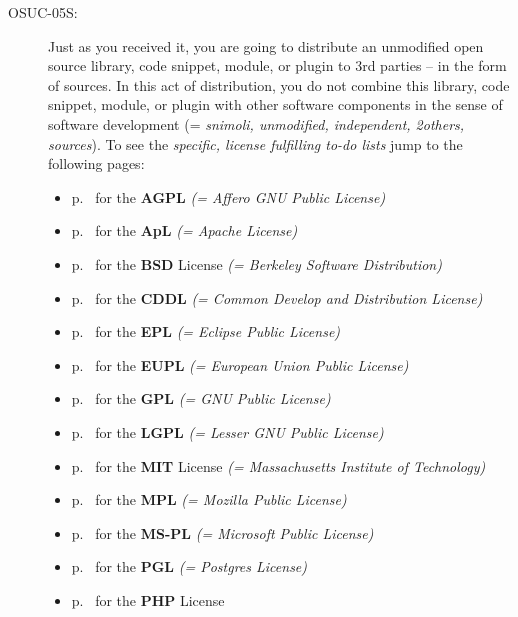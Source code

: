 \begin{description}
\item[OSUC-05S:]\label{OSUC-05S-DEF} Just as you received it, you are going to
distribute an unmodified open source library, code snippet, module, or plugin to
3rd parties  -- in the form of sources. In this act of distribution, you do not
combine this library, code snippet, module, or plugin with other software
components in the sense of software development (= \textit{snimoli, unmodified,
independent, 2others, sources}). To see the \textit{specific, license fulfilling
to-do lists} jump to the following pages:
  \begin{itemize}
    \item p.\ \pageref{OSUC-05S-AGPL} for the \textbf{AGPL}
      \textit{(= Affero GNU Public License)} 
    \item p.\ \pageref{OSUC-05S-Apache20} for the \textbf{ApL}
      \textit{(= Apache License)}
    \item p.\ \pageref{OSUC-05S-BSD} for the \textbf{BSD} License
      \textit{(= Berkeley Software Distribution)}
    \item p.\ \pageref{OSUC-05S-CDDL} for the \textbf{CDDL}
      \textit{(= Common Develop and Distribution License)}  
    \item p.\ \pageref{OSUC-05S-EPL} for the \textbf{EPL}
      \textit{(= Eclipse Public License)}     
    \item p.\ \pageref{OSUC-05S-EUPL} for the \textbf{EUPL}
      \textit{(= European Union Public License)} 
    \item p.\ \pageref{OSUC-05S-GPL} for the \textbf{GPL}
       \textit{(= GNU Public License)} 
    \item p.\ \pageref{OSUC-05S-LGPL} for the \textbf{LGPL}
      \textit{(= Lesser GNU Public License)}           
    \item p.\ \pageref{OSUC-05S-MIT} for the \textbf{MIT} License
       \textit{(= Massachusetts Institute of Technology)} 
    \item p.\ \pageref{OSUC-05S-MPL} for the \textbf{MPL}
      \textit{(= Mozilla Public License)}     
    \item p.\ \pageref{OSUC-05S-MS-PL} for the \textbf{MS-PL}
      \textit{(= Microsoft Public License)} 
    \item p.\ \pageref{OSUC-05S-PGL} for the \textbf{PGL}
      \textit{(= Postgres License)} 
    \item p.\ \pageref{OSUC-05S-PHP} for the \textbf{PHP} License 
  \end{itemize}


\end{description}
